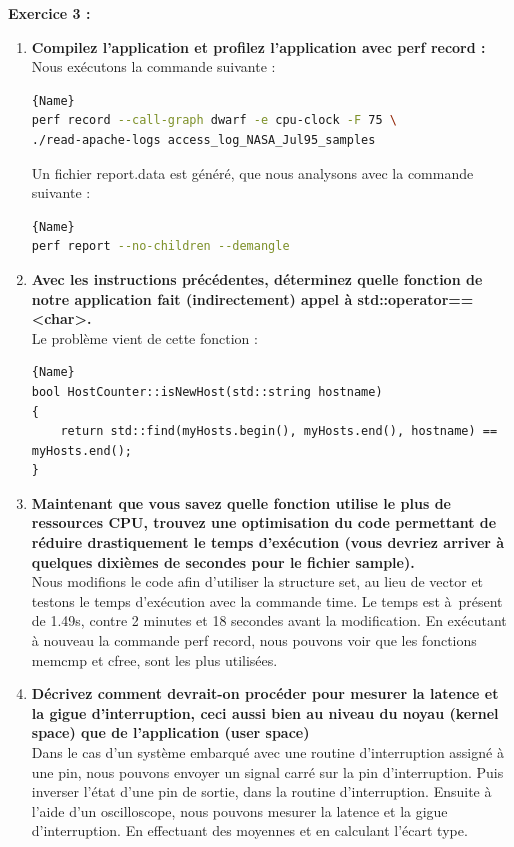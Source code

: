 \documentclass[
	a4paper, %
	10pt, %
]{CSUniSchoolLabReport}
\begin{document}

\textbf{Exercice 3 :}
\begin{enumerate}[label=\textbf{\arabic*}]

\item \textbf{Compilez l’application et profilez l’application avec perf record :}\\
Nous ex\'ecutons la commande suivante :
\begin{lstlisting}[language=bash, firstnumber=1]{Name}
perf record --call-graph dwarf -e cpu-clock -F 75 \
./read-apache-logs access_log_NASA_Jul95_samples
\end{lstlisting}

Un fichier report.data est généré, que nous analysons avec la commande suivante :
\begin{lstlisting}[language=bash, firstnumber=1]{Name}
perf report --no-children --demangle
\end{lstlisting}
\item \textbf{Avec les instructions précédentes, déterminez quelle fonction de notre application fait (indirectement) appel à std::operator==<char>.}\\

Le probl\`eme vient de cette fonction :
\begin{lstlisting}[style=CStyle, caption=Extrait de hostcounter.cpp, firstnumber=1]{Name}
bool HostCounter::isNewHost(std::string hostname)
{
    return std::find(myHosts.begin(), myHosts.end(), hostname) == myHosts.end();
}
\end{lstlisting}

\item \textbf{Maintenant que vous savez quelle fonction utilise le plus de ressources CPU, trouvez une optimisation du code permettant de réduire drastiquement le temps d’exécution (vous devriez arriver à quelques dixièmes de secondes pour le fichier sample).}\\
Nous modifions le code afin d'utiliser la structure set, au lieu de vector et testons le temps d'ex\'ecution avec la commande time.
Le temps est \`a\ pr\'esent de 1.49s, contre 2 minutes et 18 secondes avant la modification.
En ex\'ecutant \`a nouveau la commande perf record, nous pouvons voir que les fonctions memcmp et cfree, sont les plus utilisées.

\item \textbf{Décrivez comment devrait-on procéder pour mesurer la latence et la gigue d’interruption, ceci aussi bien au niveau du noyau (kernel space) que de l’application (user space)}\\
Dans le cas d'un syst\`eme embarqué avec une routine d'interruption assigné \`a une pin, nous pouvons envoyer un signal carré sur la pin d'interruption.
Puis inverser l'\'etat d'une pin de sortie, dans la routine d'interruption.
Ensuite \`a l'aide d'un oscilloscope, nous pouvons mesurer la latence et la gigue d'interruption. En effectuant des moyennes et en calculant l'\'ecart type.\\
\end{enumerate}
\end{document}
